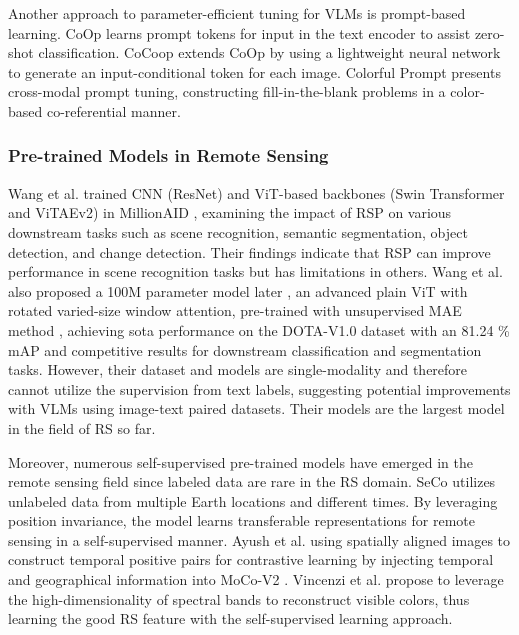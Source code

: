 \documentclass[journal]{IEEEtran}
\begin{document}
Another approach to parameter-efficient tuning for VLMs is prompt-based learning. CoOp \cite{coop} learns prompt tokens for input in the text encoder to assist zero-shot classification. CoCoop \cite{cocoop} extends CoOp by using a lightweight neural network to generate an input-conditional token for each image. Colorful Prompt \cite{colorfulprompt} presents cross-modal prompt tuning, constructing fill-in-the-blank problems in a color-based co-referential manner.


\subsubsection{Pre-trained Models in Remote Sensing}

Wang et al. trained CNN (ResNet) and ViT-based backbones (Swin Transformer and ViTAEv2)\cite{rsp} in MillionAID \cite{millionaid}, examining the impact of RSP on various downstream tasks such as scene recognition, semantic segmentation, object detection, and change detection. Their findings indicate that RSP can improve performance in scene recognition tasks but has limitations in others. Wang et al. also proposed a 100M parameter model later \cite{wang2022advancing}, an advanced plain ViT with rotated varied-size window attention, pre-trained with unsupervised MAE method \cite{mae}, achieving sota performance on the DOTA-V1.0 \cite{dota} dataset with an 81.24 \% mAP and competitive results for downstream classification and segmentation tasks. However, their dataset and models are single-modality and therefore cannot utilize the supervision from text labels, suggesting potential improvements with VLMs using image-text paired datasets. Their models are the largest model in the field of RS so far. 

Moreover, numerous self-supervised pre-trained models have emerged in the remote sensing field since labeled data are rare in the RS domain. SeCo \cite{mañas2021seasonal} utilizes unlabeled data from multiple Earth locations and different times. By leveraging position invariance, the model learns transferable representations for remote sensing in a self-supervised manner. Ayush et al. \cite{ayush2022geographyaware} using spatially aligned images to construct temporal positive pairs for contrastive learning by injecting temporal and geographical information into MoCo-V2 \cite{mocov2}.  Vincenzi et al. \cite{vincenzi2020color} propose to leverage the high-dimensionality of spectral bands to reconstruct visible colors, thus learning the good RS feature with the self-supervised learning approach.
\end{document}
